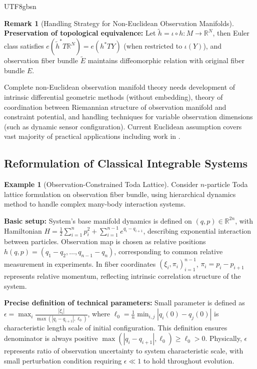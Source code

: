 \documentclass[a4paper,12pt]{extarticle}
\theoremstyle{definition}
\newtheorem{example}{Example}
\newtheorem{remark}{Remark}
\begin{document}
\begin{CJK}{UTF8}{gbsn}
\begin{remark}[Handling Strategy for Non-Euclidean Observation Manifolds]
\textbf{Preservation of topological equivalence:} Let $\tilde{h} = \iota \circ h: M \to \mathbb{R}^N$, then Euler class satisfies $e(\tilde{h}^*T\mathbb{R}^N) = e(h^*TY)$ (when restricted to $\iota(Y)$), and observation fiber bundle $\tilde{E}$ maintains diffeomorphic relation with original fiber bundle $E$.

Complete non-Euclidean observation manifold theory needs development of intrinsic differential geometric methods (without embedding), theory of coordination between Riemannian structure of observation manifold and constraint potential, and handling techniques for variable observation dimensions (such as dynamic sensor configuration). Current Euclidean assumption covers vast majority of practical applications including work in \cite{zheng2025learning}.
\end{remark}

\subsection{Reformulation of Classical Integrable Systems}

\begin{example}[Observation-Constrained Toda Lattice]
Consider $n$-particle Toda lattice formulation on observation fiber bundle, using hierarchical dynamics method to handle complex many-body interaction systems.

\textbf{Basic setup:}
System's base manifold dynamics is defined on $(q,p) \in \mathbb{R}^{2n}$, with Hamiltonian $H = \frac{1}{2}\sum_{i=1}^n p_i^2 + \sum_{i=1}^{n-1} e^{q_i - q_{i+1}}$, describing exponential interaction between particles. Observation map is chosen as relative positions $h(q,p) = (q_1-q_2, \ldots, q_{n-1}-q_n)$, corresponding to common relative measurement in experiments. In fiber coordinates $(\xi_i, \pi_i)_{i=1}^{n-1}$, $\pi_i = p_i - p_{i+1}$ represents relative momentum, reflecting intrinsic correlation structure of the system.

\textbf{Precise definition of technical parameters:}
Small parameter is defined as $\epsilon = \max_i \frac{|\xi_i|}{\max(|q_i - q_{i+1}|, \ell_0)}$, where $\ell_0 = \frac{1}{n}\min_{i,j} |q_i(0) - q_j(0)|$ is characteristic length scale of initial configuration. This definition ensures denominator is always positive $\max(|q_i - q_{i+1}|, \ell_0) \geq \ell_0 > 0$. Physically, $\epsilon$ represents ratio of observation uncertainty to system characteristic scale, with small perturbation condition requiring $\epsilon \ll 1$ to hold throughout evolution.


\end{example}
\end{CJK}
\end{document}
